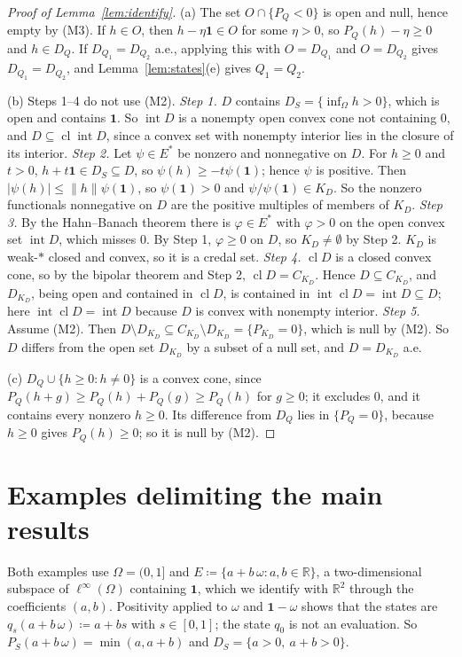\documentclass[11pt]{article}
\newcommand{\R}{\mathbb{R}}
\newcommand{\one}{\mathbf{1}}
\DeclareMathOperator{\cl}{cl}
\DeclareMathOperator{\inter}{int}
\theoremstyle{plain}
\theoremstyle{definition}
\theoremstyle{remark}
\begin{document}
\begin{proof}[Proof of Lemma~\ref{lem:identify}]
(a) The set $O\cap\{P_Q<0\}$ is open and null, hence empty by (M3). If $h\in O$, then
$h-\eta\one\in O$ for some $\eta>0$, so $P_Q(h)-\eta\ge0$ and $h\in D_Q$. If $D_{Q_1}=D_{Q_2}$
a.e., applying this with $O=D_{Q_1}$ and $O=D_{Q_2}$ gives $D_{Q_1}=D_{Q_2}$, and
Lemma~\ref{lem:states}(e) gives $Q_1=Q_2$.

(b) Steps 1--4 do not use (M2). \emph{Step 1.} $D$ contains $D_S=\{\inf_\Omega h>0\}$, which is open and contains $\one$. So
$\inter D$ is a nonempty open convex cone not containing $0$, and $D\subseteq\cl\inter D$, since
a convex set with nonempty interior lies in the closure of its interior.
\emph{Step 2.} Let $\psi\in E^\ast$ be nonzero and nonnegative on $D$. For $h\ge0$ and $t>0$,
$h+t\one\in D_S\subseteq D$, so $\psi(h)\ge-t\psi(\one)$; hence $\psi$ is positive. Then
$|\psi(h)|\le\|h\|\psi(\one)$, so $\psi(\one)>0$ and $\psi/\psi(\one)\in K_D$. So the nonzero
functionals nonnegative on $D$ are the positive multiples of members of $K_D$.
\emph{Step 3.} By the Hahn--Banach theorem there is $\varphi\in E^\ast$ with $\varphi>0$ on the
open convex set $\inter D$, which misses $0$. By Step 1, $\varphi\ge0$ on $D$, so $K_D\ne
\emptyset$ by Step 2. $K_D$ is weak-$\ast$ closed and convex, so it is a credal set.
\emph{Step 4.} $\cl D$ is a closed convex cone, so by the bipolar theorem and Step 2, $\cl D=
C_{K_D}$. Hence $D\subseteq C_{K_D}$, and $D_{K_D}$, being open and contained in $\cl D$, is
contained in $\inter\cl D=\inter D\subseteq D$; here $\inter\cl D=\inter D$ because $D$ is convex
with nonempty interior.
\emph{Step 5.} Assume (M2). Then $D\setminus D_{K_D}\subseteq C_{K_D}\setminus D_{K_D}=\{P_{K_D}=0\}$, which is
null by (M2). So $D$ differs from the open set $D_{K_D}$ by a subset of a null set, and $D=
D_{K_D}$ a.e.

(c) $D_Q\cup\{h\ge0:h\ne0\}$ is a convex cone, since $P_Q(h+g)\ge P_Q(h)+P_Q(g)\ge
P_Q(h)$ for $g\ge0$; it excludes $0$, and it contains every nonzero $h\ge0$. Its difference from
$D_Q$ lies in $\{P_Q=0\}$, because $h\ge0$ gives $P_Q(h)\ge0$; so it is null by (M2).
\end{proof}

\section{Examples delimiting the main results}\label{app:examples}

Both examples use $\Omega=(0,1]$ and $E\coloneqq\{a+b\,\omega:a,b\in\R\}$, a two-dimensional
subspace of $\ell^\infty(\Omega)$ containing $\one$, which we identify with $\R^2$ through the
coefficients $(a,b)$. Positivity applied to $\omega$ and $\one-\omega$ shows that the states are
$q_s(a+b\,\omega)\coloneqq a+bs$ with $s\in[0,1]$; the state $q_0$ is not an evaluation. So
$P_S(a+b\,\omega)=\min(a,a+b)$ and $D_S=\{a>0,\ a+b>0\}$.
\end{document}
